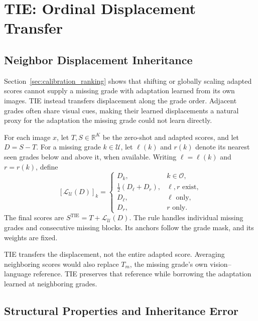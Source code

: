 \section{TIE: Ordinal Displacement Transfer}
\label{sec:tie}

\subsection{Neighbor Displacement Inheritance}

Section~\ref{sec:calibration_ranking} shows that shifting or globally scaling adapted scores cannot supply a missing grade with adaptation learned from its own images. TIE instead transfers displacement along the grade order. Adjacent grades often share visual cues, making their learned displacements a natural proxy for the adaptation the missing grade could not learn directly.

For each image $x$, let $T,S\in\mathbb R^K$ be the zero-shot and adapted scores, and let $D=S-T$. For a missing grade $k\in\mathcal U$, let $\ell(k)$ and $r(k)$ denote its nearest seen grades below and above it, when available. Writing $\ell=\ell(k)$ and $r=r(k)$, define
\begin{equation}
\label{eq:tie_operator}
[\mathcal L_{\mathcal U}(D)]_k=\begin{cases}
D_k, & k\in\mathcal O,\\
\tfrac12(D_{\ell}+D_r), & \ell,r\text{ exist},\\
D_{\ell}, & \ell\text{ only},\\
D_r, & r\text{ only}.
\end{cases}
\end{equation}
The final scores are $S^{\mathrm{TIE}}=T+\mathcal L_{\mathcal U}(D)$. The rule handles individual missing grades and consecutive missing blocks. Its anchors follow the grade mask, and its weights are fixed.

TIE transfers the displacement, not the entire adapted score. Averaging neighboring scores would also replace $T_m$, the missing grade's own vision--language reference. TIE preserves that reference while borrowing the adaptation learned at neighboring grades.

\subsection{Structural Properties and Inheritance Error}

